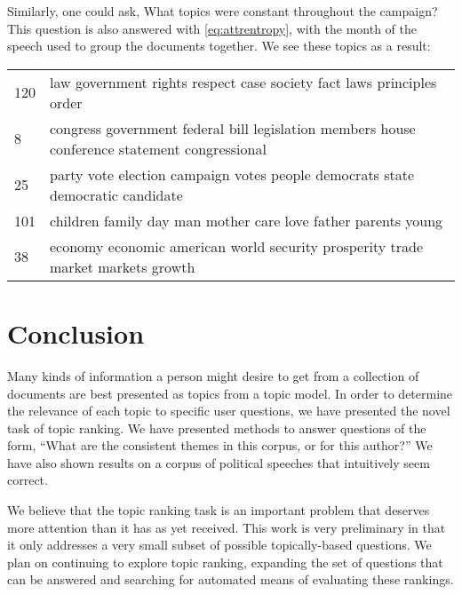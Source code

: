 \documentclass{article}
\begin{document}
Similarly, one could ask, What topics were constant throughout the campaign?
This question is also answered with \eqref{eq:attrentropy}, with the month of
the speech used to group the documents together.  We see these topics as a
result:

\begin{tabular}{l|l}
  120 & law government rights respect case society fact laws principles order \\
  8 & congress government federal bill legislation members house conference
	statement congressional \\
  25 & party vote election campaign votes people democrats state democratic
	candidate \\
  101 & children family day man mother care love father parents young \\
  38 & economy economic american world security prosperity trade market markets
	growth \\
\end{tabular}

\section{Conclusion}
\label{sec:conclusion}

Many kinds of information a person might desire to get from a collection of
documents are best presented as topics from a topic model.  In order to
determine the relevance of each topic to specific user questions, we have
presented the novel task of topic ranking.  We have presented methods to answer
questions of the form, ``What are the consistent themes in this corpus, or for
this author?''  We have also shown results on a corpus of political speeches
that intuitively seem correct.  

We believe that the topic ranking task is an important problem that deserves
more attention than it has as yet received.  This work is very preliminary in
that it only addresses a very small subset of possible topically-based
questions.  We plan on continuing to explore topic ranking, expanding the set
of questions that can be answered and searching for automated means of
evaluating these rankings.



\end{document}
